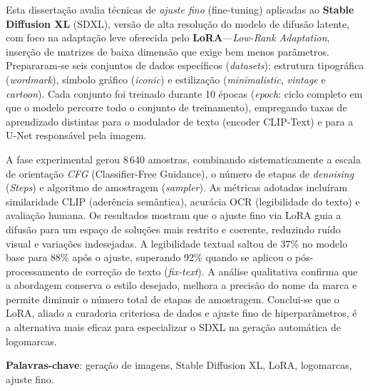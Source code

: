 \documentclass[12pt, %
openright, 
oneside, %
a4paper,    %
brazil]{facom-ufu-abntex2}
\begin{document}
\begin{resumo}
    Esta dissertação avalia técnicas de \emph{ajuste fino} (fine-tuning) aplicadas ao \textbf{Stable Diffusion XL} (SDXL), versão de alta resolução do modelo de difusão latente, com foco na adaptação leve oferecida pelo \textbf{LoRA}—\emph{Low-Rank Adaptation}, inserção de matrizes de baixa dimensão que exige bem menos parâmetros. Prepararam-se seis conjuntos de dados específicos (\emph{datasets}): estrutura tipográfica (\emph{wordmark}), símbolo gráfico (\emph{iconic}) e estilização (\emph{minimalistic}, \emph{vintage} e \emph{cartoon}). Cada conjunto foi treinado durante 10 épocas (\emph{epoch}: ciclo completo em que o modelo percorre todo o conjunto de treinamento), empregando taxas de aprendizado distintas para o modulador de texto (encoder CLIP-Text) e para a U-Net responsável pela imagem.

    A fase experimental gerou 8\,640 amostras, combinando sistematicamente a escala de orientação \emph{CFG} (Classifier-Free Guidance), o número de etapas de \emph{denoising} (\emph{Steps}) e algoritmo de amostragem (\emph{sampler}). As métricas adotadas incluíram similaridade CLIP (aderência semântica), acurácia OCR (legibilidade do texto) e avaliação humana. Os resultados mostram que o ajuste fino via LoRA guia a difusão para um espaço de soluções mais restrito e coerente, reduzindo ruído visual e variações indesejadas. A legibilidade textual saltou de 37\% no modelo base para 88\% após o ajuste, superando 92\% quando se aplicou o pós-processamento de correção de texto (\emph{fix-text}). A análise qualitativa confirma que a abordagem conserva o estilo desejado, melhora a precisão do nome da marca e permite diminuir o número total de etapas de amostragem. Conclui-se que o LoRA, aliado a curadoria criteriosa de dados e ajuste fino de hiperparâmetros, é a alternativa mais eficaz para especializar o SDXL na geração automática de logomarcas.  
    
    \vspace{\onelineskip}
    
    \noindent
    \textbf{Palavras-chave}: geração de imagens, Stable Diffusion XL, LoRA, logomarcas, ajuste fino.
 \end{resumo}


\listoffigures*
\cleardoublepage


\listoftables*
\cleardoublepage
\end{document}

